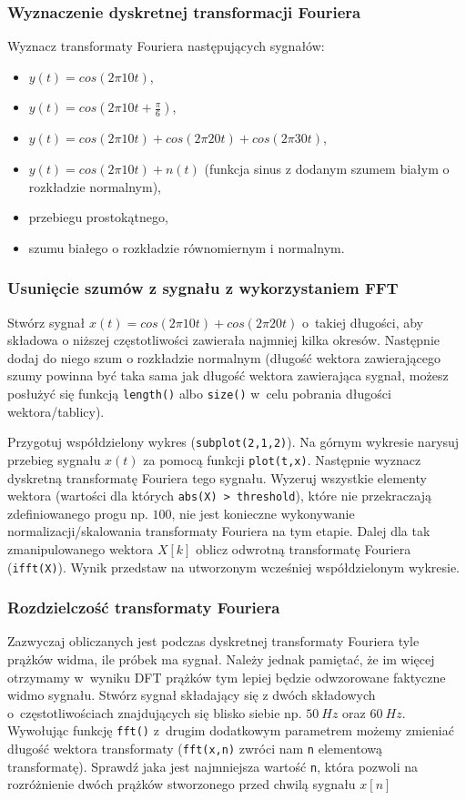\subsubsection{Wyznaczenie dyskretnej transformacji Fouriera}
Wyznacz transformaty Fouriera następujących sygnałów:
\begin{itemize}
	\item $y(t) = cos(2\pi10t)$,
	\item $y(t) = cos(2\pi10t + \frac{\pi}{6})$,
	\item $y(t) = cos(2\pi10t) + cos(2\pi20t) + cos(2\pi30t)$,
	\item $y(t) = cos(2\pi10t) + n(t)$ (funkcja sinus z dodanym szumem białym o rozkładzie normalnym),
	\item przebiegu prostokątnego,
	\item szumu białego o rozkładzie równomiernym i normalnym.
\end{itemize}

\subsubsection{Usunięcie szumów z sygnału z wykorzystaniem FFT}
Stwórz sygnał $x(t) = cos(2\pi10t) + cos(2\pi20t)$ o~takiej długości, aby składowa o niższej częstotliwości zawierała najmniej kilka okresów. Następnie dodaj do niego szum o rozkładzie normalnym (długość wektora zawierającego szumy powinna być taka sama jak długość wektora zawierająca sygnał, możesz posłużyć się funkcją \texttt{length()} albo \texttt{size()} w~celu pobrania długości wektora/tablicy). 

Przygotuj współdzielony wykres (\texttt{subplot(2,1,2)}). Na górnym wykresie narysuj przebieg sygnału $x(t)$ za pomocą funkcji \texttt{plot(t,x)}. Następnie wyznacz dyskretną transformatę Fouriera tego sygnału. Wyzeruj wszystkie elementy wektora (wartości dla których \texttt{abs(X) > threshold}), które nie przekraczają zdefiniowanego progu np. $100$, nie jest konieczne wykonywanie normalizacji/skalowania transformaty Fouriera na tym etapie. Dalej dla tak zmanipulowanego wektora $X[k]$ oblicz odwrotną transformatę Fouriera (\texttt{ifft(X)}). Wynik przedstaw na utworzonym wcześniej współdzielonym wykresie. 

\subsubsection{Rozdzielczość transformaty Fouriera}
Zazwyczaj obliczanych jest podczas dyskretnej transformaty Fouriera tyle prążków widma, ile próbek ma sygnał. Należy jednak pamiętać, że im więcej otrzymamy w~wyniku DFT prążków tym lepiej będzie odwzorowane faktyczne widmo sygnału. Stwórz sygnał składający się z dwóch składowych o~częstotliwościach znajdujących się blisko siebie np. $50~Hz$ oraz $60~Hz$. Wywołując funkcję \texttt{fft()} z~drugim dodatkowym parametrem możemy zmieniać długość wektora transformaty (\texttt{fft(x,n)} zwróci nam \texttt{n} elementową transformatę). Sprawdź jaka jest najmniejsza wartość \texttt{n}, która pozwoli na rozróżnienie dwóch prążków stworzonego przed chwilą sygnału $x[n]$

